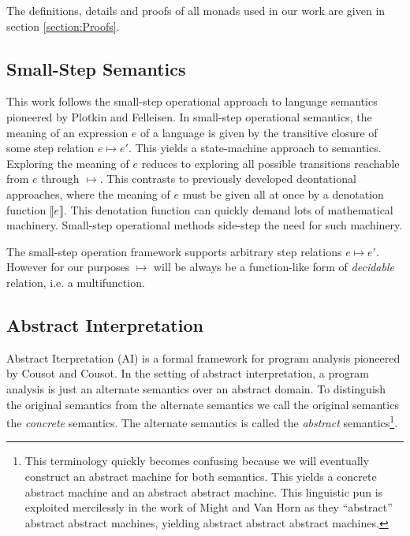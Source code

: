 \documentclass{article}
\begin{document}
The definitions, details and proofs of all monads used in our work are given in section \ref{section:Proofs}.


\subsection{Small-Step Semantics}
\label{section:Background:SmallStepSemantics}

This work follows the small-step operational approach to language semantics pioneered by Plotkin and Felleisen.
In small-step operational semantics, the meaning of an expression $e$ of a language is given by the transitive closure of some step relation $e ↦ e'$.
This yields a state-machine approach to semantics.
Exploring the meaning of $e$ reduces to exploring all possible transitions reachable from $e$ through $↦$.
This contrasts to previously developed deontational approaches, where the meaning of $e$ must be given all at once by a denotation function $⟦ e ⟧$.
This denotation function can quickly demand lots of mathematical machinery.
Small-step operational methods side-step the need for such machinery.

The small-step operation framework supports arbitrary step relations $e ↦ e'$.  
However for our purposes $↦$ will be always be a function-like form of \emph{decidable} relation, i.e. a multifunction.


\subsection{Abstract Interpretation}
\label{section:Background:AbstractInterpretation}

Abstract Iterpretation (AI) is a formal framework for program analysis pioneered by Cousot and Cousot.
In the setting of abstract interpretation, a program analysis is just an alternate semantics over an abstract domain.
To distinguish the original semantics from the alternate semantics we call the original semantics the \emph{concrete} semantics.
The alternate semantics is called the \emph{abstract} semantics\footnote{
  This terminology quickly becomes confusing because we will eventually construct an abstract machine for both semantics.
  This yields a concrete abstract machine and an abstract abstract machine. 
  This linguistic pun is exploited mercilessly in the work of Might and Van Horn as they “abstract” abstract abstract machines, yielding abstract abstract abstract machines.
}.
\end{document}

